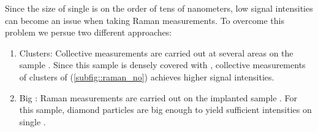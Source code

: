 			Since the size of single \nds is on the order of tens of nanometers, low signal intensities can become an issue when taking Raman measurements.
			To overcome this problem we persue two different approaches:
			\begin{enumerate}[label=\alph*),ref=\alph*)]
				\item \Nd Clusters: \label{item::raman_gband} Collective measurements are carried out at several areas on the sample \insituS. Since this sample is densely covered with \nds, collective measurements of clusters of \nds (\cref{subfig::raman_no}) achieves higher signal intensities.
				\item Big \Nds: \label{item::raman_implanted} Raman measurements are carried out on the implanted sample \implantedTao. For this sample, diamond particles are big enough to yield sufficient intensities on single \nds.
			\end{enumerate}

